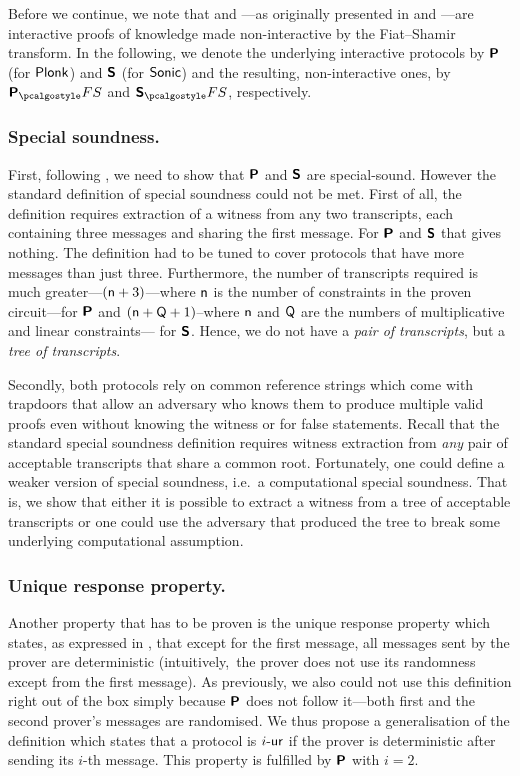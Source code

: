 \let\accentvec\vec \documentclass[runningheads]{llncs}
\begin{document}
Before we continue, we note that \plonk{} and \sonic{}---as originally presented
in \cite{EPRINT:GabWilCio19} and \cite{CCS:MBKM19}---are interactive proofs of
knowledge made non-interactive by the Fiat--Shamir transform. In the following,
we denote the underlying interactive protocols by $\bm{\mathsf{P}}$ (for $\textnormal{\textsf{Plonk}}$)
and $\bm{\mathsf{S}}$ (for ${\textnormal{\textsf{Sonic}}}$) and the resulting, non-interactive ones, by
$\plonkprotfs$ and $\sonicprotfs$, respectively.

\subsubsection{Special soundness.} 
First, following \cite{INDOCRYPT:FKMV12}, we need to show that $\bm{\mathsf{P}}$ and
$\bm{\mathsf{S}}$ are special-sound. However the standard definition of special
soundness could not be met. First of all, the definition requires extraction of
a witness from any two transcripts, each containing three messages and sharing
the first message. For $\bm{\mathsf{P}}$ and $\bm{\mathsf{S}}$ that gives nothing. The
definition had to be tuned to cover protocols that have more messages than just
three. Furthermore, the number of transcripts required is much
greater---$(\mathsf{n} + 3)$---where $\mathsf{n}$ is the
number of constraints in the proven circuit---for $\bm{\mathsf{P}}$ and $(\mathsf{n}
+ \mathsf{Q} + 1)$--where $\mathsf{n}$ and $\mathsf{Q}$ are the numbers of
multiplicative and linear constraints--- for $\bm{\mathsf{S}}$. Hence, we do not have
a \emph{pair of transcripts}, but a \emph{tree of transcripts}.

Secondly, both protocols rely on common reference strings which come with
trapdoors that allow an adversary who knows them to produce multiple valid
proofs even without knowing the witness or for false statements. Recall that the
standard special soundness definition requires witness extraction from
\emph{any} pair of acceptable transcripts that share a common root. Fortunately,
one could define a weaker version of special soundness, i.e.~a computational
special soundness. That is, we show that either it is possible to extract a
witness from a tree of acceptable transcripts or one could use the adversary
that produced the tree to break some underlying computational assumption.

\subsubsection{Unique response property.} Another property that has to be proven
is the unique response property which states, as expressed in
\cite{C:Fischlin05}, that except for the first message, all messages sent by the
prover are deterministic (intuitively,~the prover does not use its randomness
except from the first message). As previously, we also could not use this
definition right out of the box simply because $\bm{\mathsf{P}}$ does not follow
it---both first and the second prover's messages are randomised. We thus propose
a generalisation of the definition which states that a protocol is ${i\text{-}\mathsf{ur}}$ if
the prover is deterministic after sending its $i$-th message. This property is
fulfilled by $\bm{\mathsf{P}}$ with $i = 2$.
\end{document}
